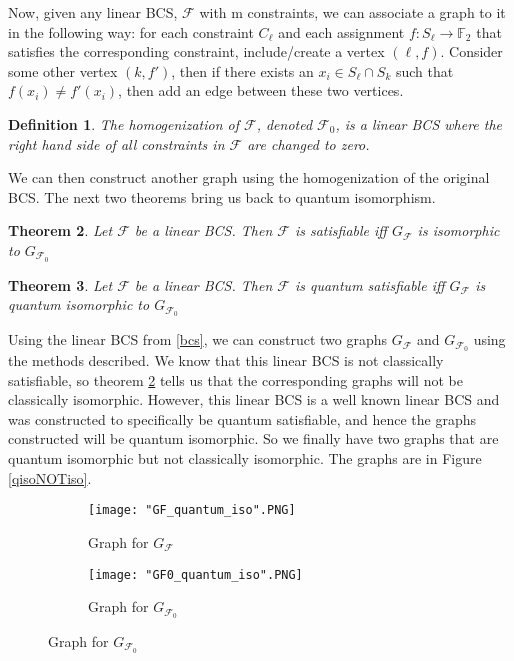 \documentclass[12pt]{article}
\newtheorem{thm}{Theorem}[section]
\newtheorem{defn}[thm]{Definition}
\begin{document}
Now, given any linear BCS, $\mathcal{F}$ with m constraints, we can associate a graph to it in the following way: for each constraint $C_{\ell}$ and each assignment $f:S_{\ell} \rightarrow \mathbb{F}_2$ that satisfies the corresponding constraint, include/create a vertex $(\ell, f)$. Consider some other vertex $(k, f')$, then if there exists an $x_i \in S_{\ell} \cap S_{k}$ such that $f(x_i) \neq  f'(x_i)$, then add an edge between these two vertices.

\begin{defn}
The homogenization of $\mathcal{F}$, denoted $\mathcal{F}_0$, is a linear BCS where the right hand side of all constraints in $\mathcal{F}$ are changed to zero.
\end{defn}
We can then construct another graph using the homogenization of the original BCS. The next two theorems bring us back to quantum isomorphism.


\begin{thm}
\label{classicalBCS}
Let $\mathcal{F}$ be a linear BCS. Then $\mathcal{F}$ is satisfiable iff $G_{\mathcal{F}}$ is isomorphic to $G_{\mathcal{F}_0}$
\end{thm}

\begin{thm}
\label{quantumBCS}
Let $\mathcal{F}$ be a linear BCS. Then $\mathcal{F}$ is quantum satisfiable iff $G_{\mathcal{F}}$ is quantum isomorphic to $G_{\mathcal{F}_0}$
\end{thm}

Using the linear BCS from \ref{bcs}, we can construct two graphs $G_{\mathcal{F}}$ and $G_{\mathcal{F}_0}$ using the methods described. We know that this linear BCS is not classically satisfiable, so theorem \ref{classicalBCS} tells us that the corresponding graphs will not be classically isomorphic. However, this linear BCS is a well known linear BCS and was constructed to specifically be quantum satisfiable, and hence the graphs constructed will be quantum isomorphic. So we finally have two graphs that are quantum isomorphic but not classically isomorphic. The graphs are in Figure \ref{qisoNOTiso}.

\begin{figure}
\label{qisoNOTiso}
\centering
  \begin{subfigure}[b]{0.4\textwidth}
    \texttt{[image: "GF\_quantum\_iso".PNG]}
    \caption{Graph for $G_{\mathcal{F}}$}
    \label{fig:Gf}
  \end{subfigure}
  \begin{subfigure}[b]{0.4\textwidth}
    \texttt{[image: "GF0\_quantum\_iso".PNG]}
    \caption{Graph for $G_{\mathcal{F}_0}$}
    \label{fig:Gf0}
  \end{subfigure}
\end{figure}
\end{document}
